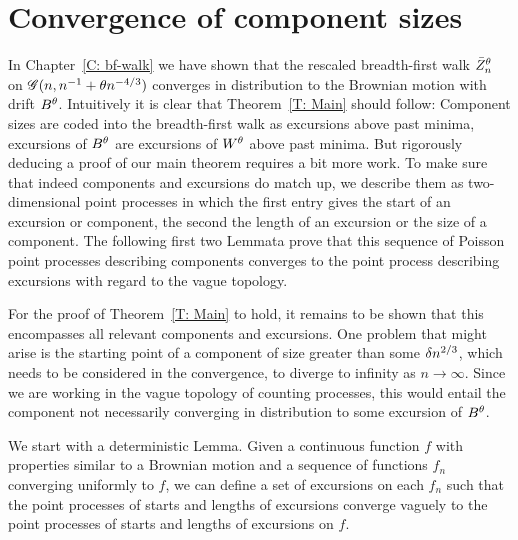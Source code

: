 
\chapter{Convergence of component sizes} \label{C: convergence}


In Chapter~\ref{C: bf-walk} we have shown that the rescaled breadth-first walk $\bar{Z}^{\theta}_n$ on $\mathscr{G}(n, n^{-1} + \theta n^{-4/3})$
converges in distribution to the Brownian motion with drift $B^{\theta}$.
Intuitively it is clear that Theorem~\ref{T: Main} should follow:
Component sizes are coded into the breadth-first walk as excursions above past minima,
excursions of $B^{\theta}$ are excursions of $W^{\theta}$ above past minima.
But rigorously deducing a proof of our main theorem requires a bit more work.
To make sure that indeed components and excursions do match up,
we describe them as two-dimensional point processes
in which the first entry gives the start of an excursion or component, 
the second the length of an excursion or the size of a component.
The following first two Lemmata prove that this sequence of Poisson point processes describing components 
converges to the point process describing excursions with regard to the vague topology.

For the proof of Theorem~\ref{T: Main} to hold, it remains to be shown that this encompasses all relevant components and excursions.
One problem that might arise is the starting point of a component of size greater than some $\delta n^{2 / 3}$, 
which needs to be considered in the convergence, to diverge to infinity as $n \rightarrow \infty$.
Since we are working in the vague topology of counting processes, 
this would entail the component not necessarily converging in distribution to some excursion of $B^{\theta}$.



We start with a deterministic Lemma.
Given a continuous function $f$ with properties similar to a Brownian motion
and a sequence of functions $f_n$ converging uniformly to $f$,
we can define a set of excursions on each $f_n$ such that
the point processes of starts and lengths of excursions converge vaguely to the point processes of starts and lengths of excursions on $f$.

